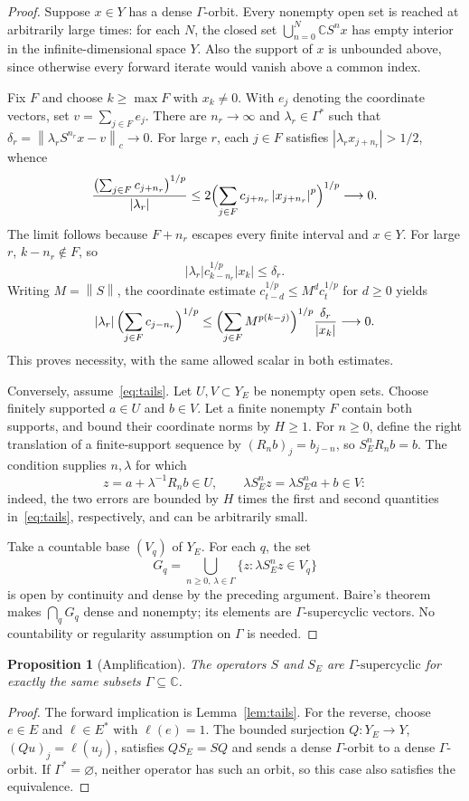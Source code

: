 \documentclass[11pt]{article}
\newtheorem{proposition}[theorem]{Proposition}
\theoremstyle{remark}
\newcommand{\C}{\mathbb C}
\newcommand{\norm}[1]{\left\|#1\right\|}
\newcommand{\abs}[1]{\left|#1\right|}
\newcommand{\gs}{\Gamma\text{-supercyclic}}
\begin{document}
\begin{proof}
Suppose $x\in Y$ has a dense $\Gamma$-orbit. Every nonempty open set is reached at arbitrarily large times: for each $N$, the closed set $\bigcup_{n=0}^N\C S^n x$ has empty interior in the infinite-dimensional space $Y$. Also the support of $x$ is unbounded above, since otherwise every forward iterate would vanish above a common index.

Fix $F$ and choose $k\ge\max F$ with $x_k\ne0$. With $e_j$ denoting the coordinate vectors, set $v=\sum_{j\in F}e_j$. There are $n_r\to\infty$ and $\lambda_r\in\Gamma^*$ such that $\delta_r=\norm{\lambda_r S^{n_r}x-v}_c\to0$. For large $r$, each $j\in F$ satisfies $\abs{\lambda_r x_{j+n_r}}>1/2$, whence
\[
\frac{\bigl(\sum_{j\in F}c_{j+n_r}\bigr)^{1/p}}{\abs{\lambda_r}}
\le 2\Bigl(\sum_{j\in F}c_{j+n_r}\abs{x_{j+n_r}}^p\Bigr)^{1/p}\longrightarrow0.
\]
The limit follows because $F+n_r$ escapes every finite interval and $x\in Y$. For large $r$, $k-n_r\notin F$, so
\[
\abs{\lambda_r}c_{k-n_r}^{1/p}\abs{x_k}\le\delta_r.
\]
Writing $M=\norm{S}$, the coordinate estimate $c_{t-d}^{1/p}\le M^d c_t^{1/p}$ for $d\ge0$ yields
\[
\abs{\lambda_r}\Bigl(\sum_{j\in F}c_{j-n_r}\Bigr)^{1/p}
\le \Bigl(\sum_{j\in F}M^{p(k-j)}\Bigr)^{1/p}\frac{\delta_r}{\abs{x_k}}
\longrightarrow0.
\]
This proves necessity, with the same allowed scalar in both estimates.

Conversely, assume~\eqref{eq:tails}. Let $U,V\subset Y_E$ be nonempty open sets. Choose finitely supported $a\in U$ and $b\in V$. Let a finite nonempty $F$ contain both supports, and bound their coordinate norms by $H\ge1$. For $n\ge0$, define the right translation of a finite-support sequence by $(R_n b)_j=b_{j-n}$, so $S_E^nR_n b=b$. The condition supplies $n,\lambda$ for which
\[
z=a+\lambda^{-1}R_n b\in U,\qquad
\lambda S_E^nz=\lambda S_E^na+b\in V:
\]
indeed, the two errors are bounded by $H$ times the first and second quantities in~\eqref{eq:tails}, respectively, and can be arbitrarily small.

Take a countable base $(V_q)$ of $Y_E$. For each $q$, the set
\[
G_q=\bigcup_{n\ge0,\,\lambda\in\Gamma}\{z:\lambda S_E^nz\in V_q\}
\]
is open by continuity and dense by the preceding argument. Baire's theorem makes $\bigcap_qG_q$ dense and nonempty; its elements are $\Gamma$-supercyclic vectors. No countability or regularity assumption on $\Gamma$ is needed.
\end{proof}

\begin{proposition}[Amplification]\label{prop:amp}
The operators $S$ and $S_E$ are $\gs$ for exactly the same subsets $\Gamma\subseteq\C$.
\end{proposition}
\begin{proof}
The forward implication is Lemma~\ref{lem:tails}. For the reverse, choose $e\in E$ and $\ell\in E^*$ with $\ell(e)=1$. The bounded surjection $Q:Y_E\to Y$, $(Qu)_j=\ell(u_j)$, satisfies $QS_E=SQ$ and sends a dense $\Gamma$-orbit to a dense $\Gamma$-orbit. If $\Gamma^*=\varnothing$, neither operator has such an orbit, so this case also satisfies the equivalence.
\end{proof}
\end{document}
